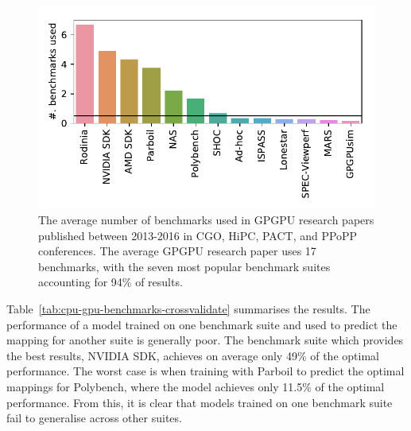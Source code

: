 \begin{figure}
  \centering
  \includegraphics{img/motivation-c} %
  \caption[Benchmark counts in GPGPU research papers]{%
    The average number of benchmarks used in GPGPU research papers published between 2013-2016 in CGO, HiPC, PACT, and PPoPP conferences. The average GPGPU research paper uses 17 benchmarks, with the seven most popular benchmark suites accounting for 94\% of results.%
  }%
  \label{fig:benchmark-suite-distribution}
\end{figure}

\begin{table}
	\centering
	
	\caption[Cross-validation of benchmark suites on a predictive model]{%
		Performance relative to the optimal of the \citeauthor{Grewe2013} predictive model across different benchmark suites on an AMD GPU. The columns show the suite used for training; the rows show the suite used for testing. On average, a predictive model trained on one benchmark suite and tested on another achieves only 49\% of the optimal performance.%
	}
	\label{tab:cpu-gpu-benchmarks-crossvalidate}
\end{table}

Table~\ref{tab:cpu-gpu-benchmarks-crossvalidate} summarises the results. The performance of a model trained on one benchmark suite and used to predict the mapping for another suite is generally poor. The benchmark suite which provides the best results, NVIDIA SDK, achieves on average only 49\% of the optimal performance. The worst case is when training with Parboil to predict the optimal mappings for Polybench, where the model achieves only 11.5\% of the optimal performance. From this, it is clear that models trained on one benchmark suite fail to generalise across other suites.

